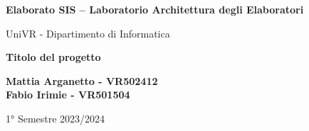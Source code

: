\begin{titlepage}
	\begin{center}
		\vspace*{1cm}

		\Huge
		\textbf{Elaborato SIS – Laboratorio
			Architettura degli
			Elaboratori}

		\vspace{0.5cm}
		\LARGE
		UniVR - Dipartimento di Informatica

		\vspace{1cm}
		\huge
		\textbf{Titolo del progetto}
		\vspace{1.5cm}


		\vfill


		\vspace{0.8cm}

		\Large
		\textbf{Mattia Arganetto - VR502412}\\
		\textbf{Fabio Irimie - VR501504}

		\vspace{0.5cm}

		1° Semestre 2023/2024

	\end{center}
\end{titlepage}
